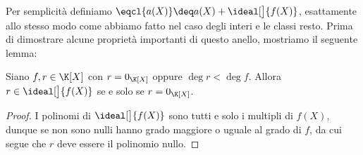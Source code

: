 Per semplicità definiamo $\eqcl{a(X)} \deq a(X) + \ideal[\big]{f(X)}$, esattamente allo stesso modo come abbiamo fatto nel caso degli interi e le classi resto.
Prima di dimostrare alcune proprietà importanti di questo anello, mostriamo il seguente lemma:
\begin{lemma}\label{lem:resto_in_ideale}
    Siano $f, r \in \K[X]$ con $r = 0_{\K[X]}$ oppure $\deg r < \deg f$. Allora $r \in \ideal[\big]{f(X)}$ se e solo se $r = 0_{\K[X]}$.
\end{lemma}
\begin{proof}
    I polinomi di $\ideal[\big]{f(X)}$ sono tutti e solo i multipli di $f(X)$, dunque se non sono nulli hanno grado maggiore o uguale al grado di $f$, da cui segue che $r$ deve essere il polinomio nullo.
\end{proof}

